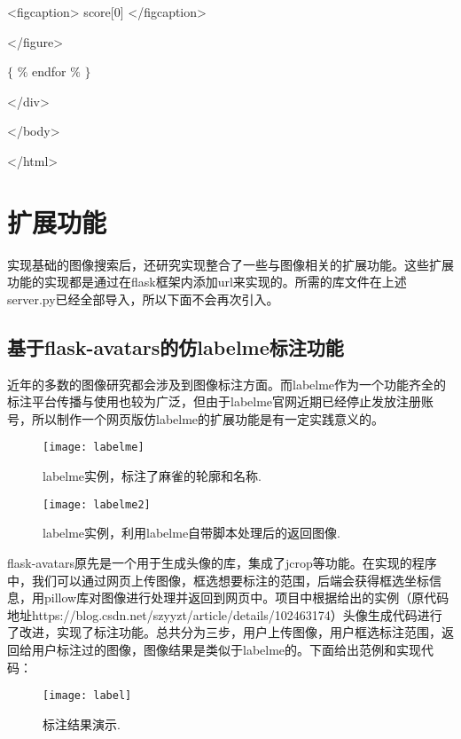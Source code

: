 \documentclass[bachelor_p]{hdu-thesis}
\begin{document}
<figcaption>{{ score[0] }}</figcaption>

</figure>

$\{$ $\%$ endfor $\%$ $\}$

</div>

</body>

</html>

\section {扩展功能}

实现基础的图像搜索后，还研究实现整合了一些与图像相关的扩展功能。这些扩展功能的实现都是通过在flask框架内添加url来实现的。所需的库文件在上述server.py已经全部导入，所以下面不会再次引入。

\subsection {基于flask-avatars的仿labelme标注功能}

近年的多数的图像研究都会涉及到图像标注方面。而labelme作为一个功能齐全的标注平台传播与使用也较为广泛，但由于labelme官网近期已经停止发放注册账号，所以制作一个网页版仿labelme的扩展功能是有一定实践意义的。

\begin{figure}[!htb]
  \centering
  \texttt{[image: labelme]}
  \caption{labelme实例，标注了麻雀的轮廓和名称.}
  \label{fig_labelme}
\end{figure}

\begin{figure}[!htb]
  \centering
  \texttt{[image: labelme2]}
  \caption{labelme实例，利用labelme自带脚本处理后的返回图像.}
  \label{fig_labelme2}
\end{figure}



flask-avatars原先是一个用于生成头像的库，集成了jcrop等功能。在实现的程序中，我们可以通过网页上传图像，框选想要标注的范围，后端会获得框选坐标信息，用pillow库对图像进行处理并返回到网页中。项目中根据给出的实例（原代码地址https://blog.csdn.net/szyyzt/article/details/102463174）头像生成代码进行了改进，实现了标注功能。总共分为三步，用户上传图像，用户框选标注范围，返回给用户标注过的图像，图像结果是类似于labelme的。下面给出范例和实现代码：

\begin{figure}[!htb]
  \centering
  \texttt{[image: label]}
  \caption{标注结果演示.}
  \label{fig_label}
\end{figure}
\end{document}
